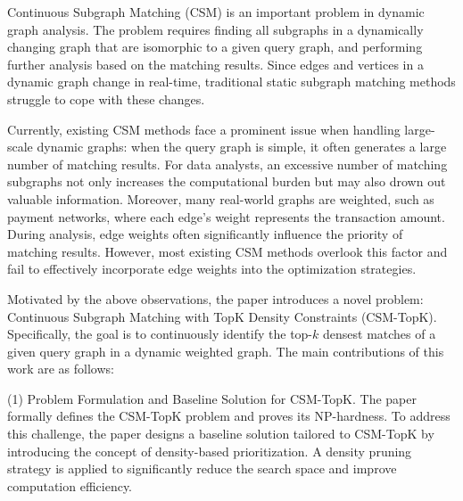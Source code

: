 \begin{enabstract}
	Continuous Subgraph Matching (CSM) is an important problem in dynamic graph analysis. 
	The problem requires finding all subgraphs in a dynamically changing graph that are isomorphic to a given query graph, and performing further analysis based on the matching results. 
	Since edges and vertices in a dynamic graph change in real-time, traditional static subgraph matching methods struggle to cope with these changes.

    Currently, existing CSM methods face a prominent issue when handling large-scale dynamic graphs: when the query graph is simple, it often generates a large number of matching results. 
	For data analysts, an excessive number of matching subgraphs not only increases the computational burden but may also drown out valuable information. 
	Moreover, many real-world graphs are weighted, such as payment networks, where each edge’s weight represents the transaction amount. 
	During analysis, edge weights often significantly influence the priority of matching results. However, most existing CSM methods overlook this factor and fail to effectively incorporate edge weights into the optimization strategies.

	Motivated by the above observations, the paper introduces a novel problem: Continuous Subgraph Matching with TopK Density Constraints (CSM-TopK). Specifically, the goal is to continuously identify the top-$k$ densest matches of a given query graph in a dynamic weighted graph. The main contributions of this work are as follows:

	(1) Problem Formulation and Baseline Solution for CSM-TopK. The paper formally defines the CSM-TopK problem and proves its NP-hardness. To address this challenge, the paper designs a baseline solution tailored to CSM-TopK by introducing the concept of density-based prioritization. A density pruning strategy is applied to significantly reduce the search space and improve computation efficiency.


\end{enabstract}
